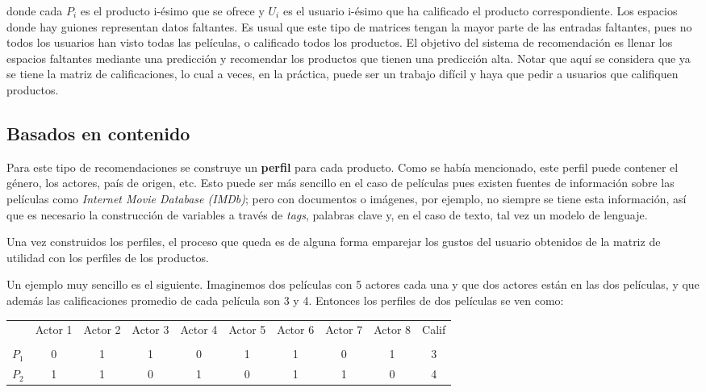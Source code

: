 donde cada $P_i$ es el producto i-ésimo que se ofrece y $U_i$ es el usuario i-ésimo que ha calificado el producto correspondiente. Los espacios donde hay guiones representan datos faltantes. Es usual que este tipo de matrices tengan la mayor parte de las entradas faltantes, pues no todos los usuarios han visto todas las películas, o calificado todos los productos. El objetivo del sistema de recomendación es llenar los espacios faltantes mediante una predicción y recomendar los productos que tienen una predicción alta. Notar que aquí se considera que ya se tiene la matriz de calificaciones, lo cual a veces, en la práctica, puede ser un trabajo difícil y haya que pedir a usuarios que califiquen productos.

\subsection{Basados en contenido}

Para este tipo de recomendaciones se construye un \textbf{perfil} para cada producto. Como se había mencionado, este perfil puede contener el género, los actores, país de origen, etc. Esto puede ser más sencillo en el caso de películas pues existen fuentes de información sobre las películas como \textit{Internet Movie Database (IMDb)}; pero con documentos o imágenes, por ejemplo, no siempre se tiene esta información, así que es necesario la construcción de variables a través de \textit{tags}, palabras clave y, en el caso de texto, tal vez un modelo de lenguaje.

Una vez construidos los perfiles, el proceso que queda es de alguna forma emparejar los gustos del usuario obtenidos de la matriz de utilidad con los perfiles de los productos.

Un ejemplo muy sencillo es el siguiente. Imaginemos dos películas con 5 actores cada una y que dos actores están en las dos películas, y que además las calificaciones promedio de cada película son 3 y 4. Entonces los perfiles de dos películas se ven como:

\begin{center}
\begin{tabular}{ c | c  c c c c c c c c}
    & Actor 1 & Actor 2 & Actor 3 & Actor 4 & Actor 5 & Actor 6 & Actor 7 & Actor 8 & Calif \\ \\
  \hline                       
$P_1$ & 0 & 1 & 1 & 0 & 1 & 1 & 0 & 1 & 3 \\
$P_2$ & 1 & 1 & 0 & 1 & 0 & 1 & 1 & 0 & 4 \\
  \hline  
\end{tabular}
\end{center}

